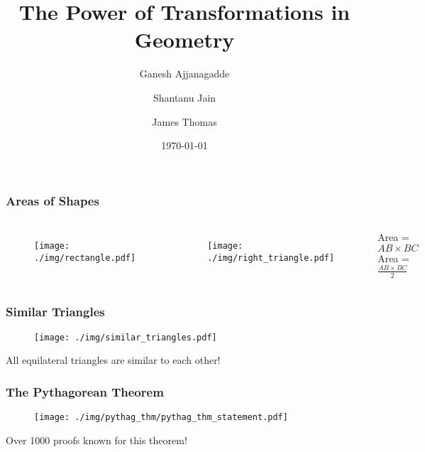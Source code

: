 \documentclass{beamer}
\title{The Power of Transformations in Geometry}
\author{Ganesh Ajjanagadde \and Shantanu Jain \and James Thomas}
\date{\today}
\begin{document}
\maketitle

\begin{frame}
\frametitle{Areas of Shapes}

\begin{columns}[c]

\begin{figure}[t]
 \texttt{[image: ./img/rectangle.pdf]}
\end{figure}
\begin{figure}[b]
 \texttt{[image: ./img/right\_triangle.pdf]}
\end{figure}

 Area =
 $AB \times BC$ \\
\vspace{40mm}
 Area =
 $\frac{AB \times BC}{2}$

\end{columns}
\end{frame}

\begin{frame}
\frametitle{Similar Triangles}

\begin{figure}[t]
\begin{center}
 \texttt{[image: ./img/similar\_triangles.pdf]}
\end{center}
\end{figure}

 All equilateral triangles are similar to each other!

\end{frame}

\begin{frame}
\frametitle{The Pythagorean Theorem}

\begin{figure}[t]
\begin{center}
 \texttt{[image: ./img/pythag\_thm/pythag\_thm\_statement.pdf]}
\end{center}
\end{figure}

 Over 1000 proofs known for this theorem!

\end{frame}
\end{document}
